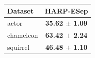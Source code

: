 \begin{tabular}{lc}
\toprule
Dataset & HARP-ESep \\
\midrule
actor & \textbf{35.62 $\pm$ 1.09} \\
chameleon & \textbf{63.42 $\pm$ 2.24} \\
squirrel & \textbf{46.48 $\pm$ 1.10} \\
\bottomrule
\end{tabular}
